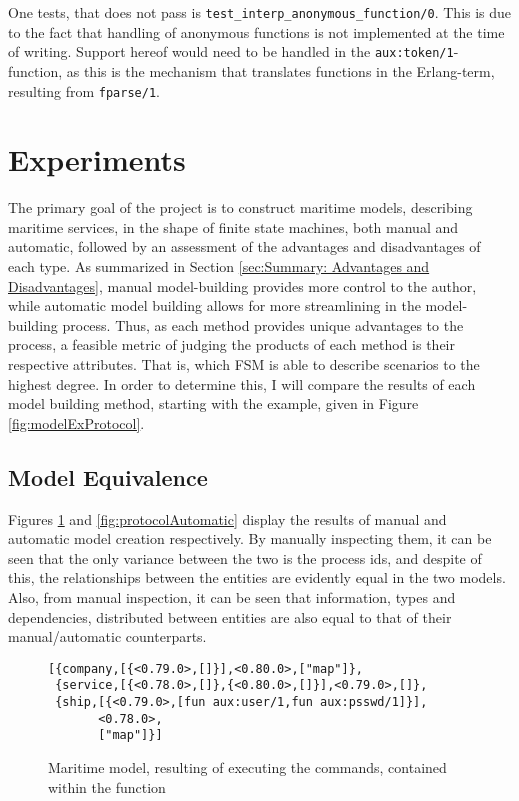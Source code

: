 One tests, that does not pass is \lstinline{test_interp_anonymous_function/0}. This is due to the fact that handling of anonymous functions is not implemented at the time of writing. Support hereof would need to be handled in the \lstinline{aux:token/1}-function, as this is the mechanism that translates functions in the Erlang-term, resulting from \lstinline{fparse/1}.

\section{Experiments}

The primary goal of the project is to construct maritime models, describing maritime services, in the shape of finite state machines, both manual and automatic, followed by an assessment of the advantages and disadvantages of each type. As summarized in Section \ref{sec:Summary: Advantages and Disadvantages}, manual model-building provides more control to the author, while automatic model building allows for more streamlining in the model-building process. Thus, as each method provides unique advantages to the process, a feasible metric of judging the products of each method is their respective attributes. That is, which FSM is able to describe scenarios to the highest degree. In order to determine this, I will compare the results of each model building method, starting with the example, given in Figure \ref{fig:modelExProtocol}.

\subsection{Model Equivalence}

Figures \ref{fig:protocolManual} and \ref{fig:protocolAutomatic} display the results of manual and automatic model creation respectively. By manually inspecting them, it can be seen that the only variance between the two is the process ids, and despite of this, the relationships between the entities are evidently equal in the two models. Also, from manual inspection, it can be seen that information, types and dependencies, distributed between entities are also equal to that of their manual/automatic counterparts.

\begin{figure}[h]
  \begin{lstlisting}[keywordstyle={}]
[{company,[{<0.79.0>,[]}],<0.80.0>,["map"]},
 {service,[{<0.78.0>,[]},{<0.80.0>,[]}],<0.79.0>,[]},
 {ship,[{<0.79.0>,[fun aux:user/1,fun aux:psswd/1]}],
       <0.78.0>,
       ["map"]}]
  \end{lstlisting}
  \caption{Maritime model, resulting of executing the commands, contained within the function }
  \label{fig:protocolManual}
\end{figure}

